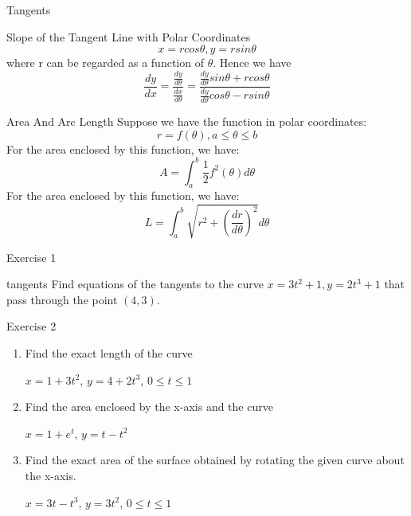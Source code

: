 \begin{frame}{Tangents}
    \begin{block}{Slope of the Tangent Line with  Polar Coordinates}
        $$x=r cos\theta,y=r sin\theta$$
        where r can be regarded as a function of $\theta$. Hence we have
        $$\frac{dy}{dx}=\frac{\frac{dy}{d\theta}}{\frac{dx}{d\theta}}=\frac{\frac{dy}{d\theta}sin \theta + r cos\theta}{\frac{dy}{d\theta} cos\theta -r sin\theta}$$
    \end{block}
\end{frame}
\begin{frame}{Area And Arc Length}
    Suppose we have the function in polar coordinates:
    $$r=f(\theta),a \leqslant \theta \leqslant b$$
    For the area enclosed by this function, we have:
    $$A=\int_a^b \frac{1}{2}f^2(\theta)d\theta$$
    For the area enclosed by this function, we have:
    $$L=\int_a^b \sqrt{r^2+(\frac{dr}{d\theta})^2} d\theta$$
\end{frame}

\begin{frame}{Exercise 1}
    \begin{block}{tangents}
        Find equations of the tangents to the curve $x = 3t^2 +1, y = 2t^3 +1$ that
        pass through the point $(4,3)$.
    \end{block}
\end{frame}

\begin{frame}{Exercise 2}
    \begin{enumerate}
        \item Find the exact length of the curve
              \begin{center}
                  $x=1+3t^2$, $y=4+2t^3$, $0 \leqslant t \leqslant 1$
              \end{center}
        \item
              Find the area enclosed by the x-axis and the curve
              \begin{center}
                  $x=1+e^t$, $y=t-t^2$
              \end{center}
        \item
              Find the exact area of the surface obtained by rotating the given curve about the x-axis.
              \begin{center}
                  $x=3t-t^3$, $y=3t^2$, $0 \leqslant t \leqslant 1$
              \end{center}
    \end{enumerate}
\end{frame}

